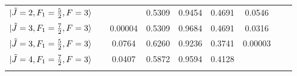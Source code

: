 \documentclass[8pt]{article}
\begin{document}
\begin{table}[]
\begin{tabular}{l l c c c c c c r}
		$\ket{\tilde{J}  = 2, F_1 = \frac{5}{2}, F = 3}$ & & & 0.5309 & 0.9454 & 0.4691 & 0.0546 &  \\
		
		$\ket{\tilde{J}  = 3, F_1 = \frac{7}{2}, F = 3}$  & & 0.00004 & 0.5309 & 0.9684 & 0.4691 & 0.0316 &  \\
		
		$\ket{\tilde{J}  = 3, F_1 = \frac{5}{2}, F = 3}$  & & 0.0764 & 0.6260 & 0.9236 & 0.3741 & 0.00003 &  \\
		
		$\ket{\tilde{J}  = 4, F_1 = \frac{7}{2}, F = 3}$ & & 0.0407 & 0.5872 & 0.9594 & 0.4128 & &  \\
		\\
		\hline
		\hline
	\end{tabular}
\end{table}
\end{document}
